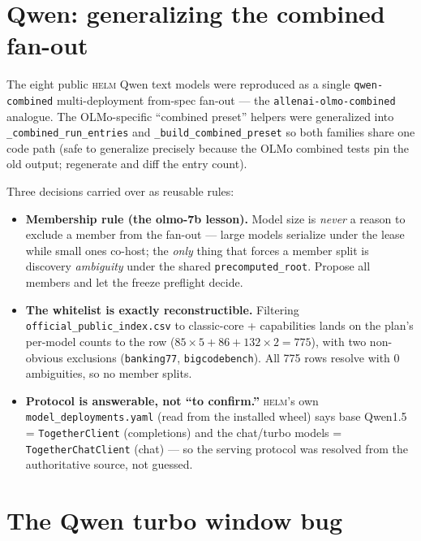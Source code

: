\documentclass[11pt]{report}
\newcommand{\code}[1]{\texttt{#1}}
\begin{document}
\section{Qwen: generalizing the combined fan-out}

The eight public \textsc{helm} Qwen text models were reproduced as a single
\code{qwen-combined} multi-deployment from-spec fan-out --- the
\code{allenai-olmo-combined} analogue. The OLMo-specific ``combined preset''
helpers were generalized into \code{\_combined\_run\_entries} and
\code{\_build\_combined\_preset} so both families share one code path (safe to
generalize precisely because the OLMo combined tests pin the old output; regenerate
and diff the entry count).

Three decisions carried over as reusable rules:

\begin{itemize}[nosep]
  \item \textbf{Membership rule (the olmo-7b lesson).} Model size is \emph{never} a
        reason to exclude a member from the fan-out --- large models serialize under
        the lease while small ones co-host; the \emph{only} thing that forces a
        member split is discovery \emph{ambiguity} under the shared
        \code{precomputed\_root}. Propose all members and let the freeze preflight
        decide.
  \item \textbf{The whitelist is exactly reconstructible.} Filtering
        \code{official\_public\_index.csv} to classic-core + capabilities lands on
        the plan's per-model counts to the row ($85\times5 + 86 + 132\times2 = 775$),
        with two non-obvious exclusions (\code{banking77}, \code{bigcodebench}). All
        775 rows resolve with 0 ambiguities, so no member splits.
  \item \textbf{Protocol is answerable, not ``to confirm.''} \textsc{helm}'s own
        \code{model\_deployments.yaml} (read from the installed wheel) says base
        Qwen1.5 = \code{TogetherClient} (completions) and the chat/turbo models =
        \code{TogetherChatClient} (chat) --- so the serving protocol was resolved
        from the authoritative source, not guessed.
\end{itemize}

\section{The Qwen turbo window bug}
\label{sec:qwenwindow}
\end{document}
